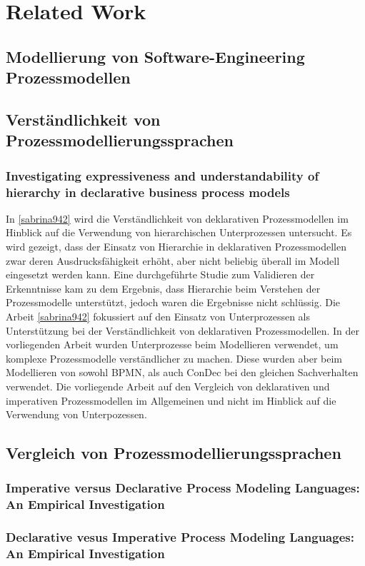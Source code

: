\chapter{Related Work}\label{sec:chapter9}

\section{Modellierung von Software-Engineering Prozessmodellen}

\section{Verständlichkeit von Prozessmodellierungssprachen}

\subsection{Investigating expressiveness and understandability of hierarchy
in declarative business process models}

In \ref{sabrina942} wird die Verständlichkeit von deklarativen Prozessmodellen im Hinblick auf die Verwendung von hierarchischen Unterprozessen untersucht. Es wird gezeigt, dass der Einsatz von Hierarchie in deklarativen Prozessmodellen zwar deren Ausdrucksfähigkeit erhöht, aber nicht beliebig überall im Modell eingesetzt werden kann. Eine durchgeführte Studie zum Validieren der Erkenntnisse kam zu dem Ergebnis, dass Hierarchie beim Verstehen der Prozessmodelle unterstützt, jedoch waren die Ergebnisse nicht schlüssig.\newline
Die Arbeit  \ref{sabrina942} fokussiert auf den Einsatz von Unterprozessen als Unterstützung bei der Verständlichkeit von deklarativen Prozessmodellen. In der vorliegenden Arbeit wurden Unterprozesse beim Modellieren verwendet, um komplexe Prozessmodelle verständlicher zu machen. Diese wurden  aber beim Modellieren von sowohl BPMN, als auch ConDec bei den gleichen Sachverhalten verwendet. Die vorliegende Arbeit auf den Vergleich von deklarativen und imperativen Prozessmodellen im Allgemeinen und nicht im Hinblick auf die Verwendung von Unterpozessen. \newline


\section{Vergleich von Prozessmodellierungssprachen}

\subsection{Imperative versus Declarative Process Modeling Languages: An Empirical Investigation}

\subsection{Declarative vesus Imperative Process Modeling Languages: An Empirical Investigation}
